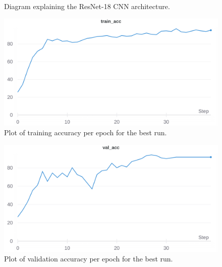 \documentclass[a4paper,11pt]{article}
\begin{document}
\begin{figure}[H]
\centering
{}
\caption{Diagram explaining the ResNet-18 CNN architecture. \cite{resnet}}
\label{fig:resnet}
\end{figure}

\begin{figure}[H]
\centering
\includegraphics[scale=0.18]{img/cv_appendix/best_run_train_acc.png}
\caption{Plot of training accuracy per epoch for the best run.}
\label{fig:train_acc}
\end{figure}

\begin{figure}[H]
\centering
\includegraphics[scale=0.18]{img/cv_appendix/best_run_val_acc.png}
\caption{Plot of validation accuracy per epoch for the best run.}
\label{fig:val_acc}
\end{figure}
\end{document}
